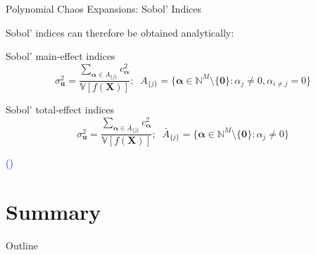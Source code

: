 \documentclass[english,aspectratio=169]{beamer}
\let\tempone\itemize
\let\temptwo\enditemize
\renewenvironment{itemize}{\tempone\addtolength{\itemsep}{0.35\baselineskip}}{\temptwo}
\renewcommand{\emph}[1]{\textcolor[HTML]{006d2c}{\fontseries{sb}\selectfont #1}}
\begin{document}
\begin{frame}[fragile]{Polynomial Chaos Expansions: Sobol' Indices}
\small

Sobol' indices can therefore be obtained analytically:
\vspace{1em}
\begin{itemize}
  \item \emph{Sobol' main-effect indices}
  \begin{equation*}
    \sigma_{\bm{u}}^2 = \frac{\sum_{\bm{\alpha} \in A_{\{j\}}} c_{\bm{\alpha}}^2}{\mathbb{V}[f(\bm{X})]};\;\;
    A_{\{j\}} = \{ \bm{\alpha} \in \mathbb{N}^M \setminus \{\bm{0}\}: \alpha_j \neq 0, \alpha_{i \neq j} = 0  \}
  \end{equation*}

  \item \emph{Sobol' total-effect indices}
  \begin{equation*}
    \sigma_{\bm{u}}^2 = \frac{\sum_{\bm{\alpha} \in \bar{A}_{\{j\}}} c_{\bm{\alpha}}^2}{\mathbb{V}[f(\bm{X})]};\;\;
    \bar{A}_{\{j\}} = \{ \bm{\alpha} \in \mathbb{N}^M \setminus \{\bm{0}\}: \alpha_j \neq 0 \}
  \end{equation*}

  {\hfill \raggedright \tiny \textcolor{blue}{(\cite{Sudret2008})}}

\end{itemize}
  
\end{frame}

\section{Summary}

\begin{frame}{Outline}
  \tableofcontents[currentsection]
\end{frame}
\end{document}
